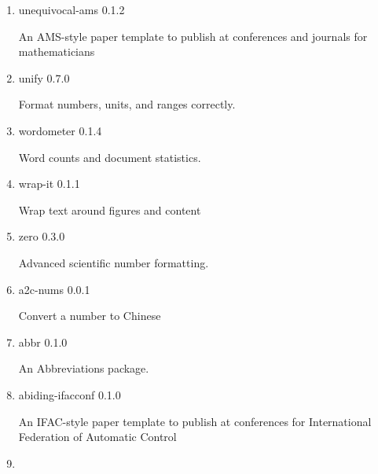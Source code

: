 \begin{enumerate}
  { }
\item
  \href{/universe/package/unequivocal-ams/}{}


  { unequivocal-ams } { 0.1.2 }

  An AMS-style paper template to publish at conferences and journals for
  mathematicians

  { }
\item
  \href{/universe/package/unify/}{}

  { unify } { 0.7.0 }

  Format numbers, units, and ranges correctly.

  { }
\item
  \href{/universe/package/wordometer/}{}

  { wordometer } { 0.1.4 }

  Word counts and document statistics.

  { }
\item
  \href{/universe/package/wrap-it/}{}

  { wrap-it } { 0.1.1 }

  Wrap text around figures and content

  { }
\item
  \href{/universe/package/zero/}{}

  { zero } { 0.3.0 }

  Advanced scientific number formatting.

  { }
\item
  \href{/universe/package/a2c-nums/}{}

  { a2c-nums } { 0.0.1 }

  Convert a number to Chinese
\item
  \href{/universe/package/abbr/}{}

  { abbr } { 0.1.0 }

  An Abbreviations package.
\item
  \href{/universe/package/abiding-ifacconf/}{}


  { abiding-ifacconf } { 0.1.0 }

  An IFAC-style paper template to publish at conferences for
  International Federation of Automatic Control
\item
  \href{/universe/package/academic-conf-pre/}{}


\end{enumerate}
